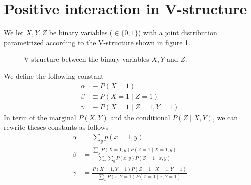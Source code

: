 \documentclass{article}
\numberwithin{equation}{section}
\begin{document}
\section{Positive interaction in V-structure}
We let $X,Y,Z$ be binary variables ($\in \{0, 1\} $) with a joint distribution 
parametrized according to the V-structure shown in figure \ref{fig:Vstrct}.
\begin{figure}[H]
        \centering
        
        \caption{V-structure between the binary variables $X, Y$ and $Z$.}
        \label{fig:Vstrct}
\end{figure}

We define the following constant
\begin{align*}
        \alpha &\equiv P(X = 1) \\ 
        \beta &\equiv P(X = 1 \mid Z = 1) \\
        \gamma &\equiv P(X = 1 \mid Z = 1 , Y = 1)
\end{align*}
In term of the marginal $P(X, Y)$ and the conditional $P(Z \mid X, Y)$,
we can rewrite theses constants as follows
\begin{align*}
        \alpha &= \sum_y p(x = 1, y) \\[2ex]
        \beta &= \frac{\displaystyle \sum_y P(X = 1, y) P(Z=1 \mid X=1, y)}{ 
        \displaystyle \sum_x \sum_y P(x, y) P(Z = 1 \mid x, y)} \\[2ex]
                \gamma &=\frac{P(X = 1, Y = 1) P(Z = 1 \mid X = 1, Y = 1)}{
                        \displaystyle
                \sum_x P(x, Y = 1) P(Z = 1 \mid x, Y = 1)} 
\end{align*}
\end{document}
